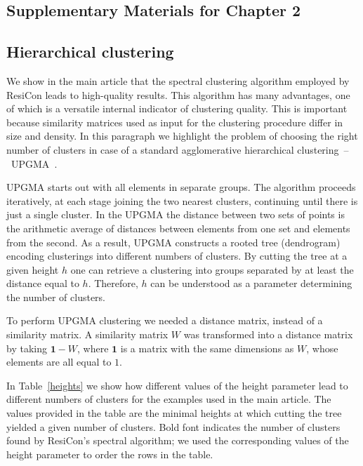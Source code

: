 \documentclass[a4paper,11pt,twoside]{book}%
\begin{document}
\begin{appendices}
  
\chapter{Supplementary Materials for Chapter 2}



\section{Hierarchical clustering}
We show in the main article that the spectral clustering algorithm employed by ResiCon leads to high-quality results.
This algorithm has many advantages, one of which is a versatile internal indicator of clustering quality.
This is important because similarity matrices used as input for the clustering procedure differ in size and density.
In this paragraph we highlight the problem of choosing the right number of clusters in case of a standard agglomerative hierarchical clustering~--~UPGMA~\cite{sokal1958statistical}.

UPGMA starts out with all elements in separate groups.
The algorithm proceeds iteratively, at each stage joining the two nearest clusters, continuing until there is just a single cluster.
In the UPGMA the distance between two sets of points is the arithmetic average of distances between elements from one set and elements from the second.
As a result, UPGMA constructs a rooted tree (dendrogram) encoding clusterings into different numbers of clusters. %
By cutting the tree at a given height $h$ one can retrieve a clustering into groups separated by at least the distance equal to $h$.
Therefore, $h$ can be understood as a parameter determining the number of clusters.

To perform UPGMA clustering we needed a distance matrix, instead of a similarity matrix.
A similarity matrix $W$ was transformed into a distance matrix by taking $\mathbf{1}-W$, where $\mathbf{1}$ is a matrix with the same dimensions as $W$, whose elements are all equal to $1$.  

In Table~\ref{heights} we show how different values of the height parameter lead to different numbers of clusters for the examples used in the main article.
The values provided in the table are the minimal heights at which cutting the tree yielded a given number of clusters.
Bold font indicates the number of clusters found by ResiCon's spectral algorithm; we used the corresponding values of the height parameter to order the rows in the table.


\end{appendices}
\end{document}
